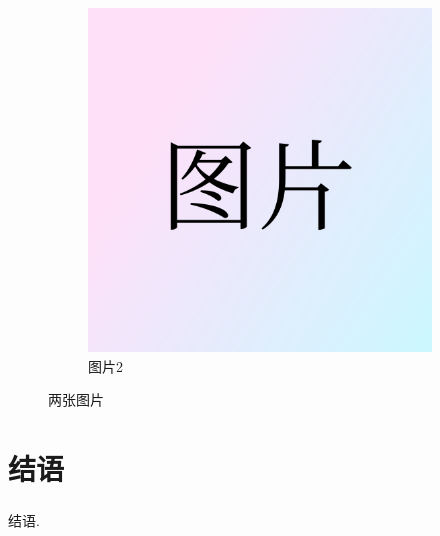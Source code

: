 \documentclass[UTF8,12pt,punct=kaiming,fontset=none]{ctexart}
\newcommand*{\upcite}[1]{
    \textsuperscript{\cite{#1}}
}
\begin{document}
\begin{figure}[H]
\begin{subfigure}{0.3\linewidth}
        \includegraphics[width=\linewidth]{figure.png}
        \caption{图片2}
        \label{fig:another-random-figure}
    \end{subfigure}
    \caption{两张图片}
    \label{fig:some-random-figure}
\end{figure}

\section{结语}
结语.\upcite{bib:art1}\upcite{bib:misc1}



\end{document}
